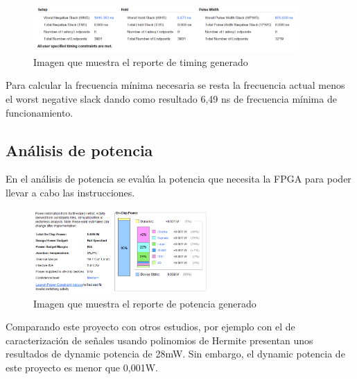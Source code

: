 	\begin{figure}[h!]
		\centering
		\includegraphics[width=0.9\textwidth]{./Images/img_res_experimentales/reportetiming.png}
		\caption{Imagen que muestra el reporte de timing generado}
		\label{fig:reporteTiming}
	\end{figure} 

	Para calcular la frecuencia mínima necesaria se resta la frecuencia actual menos el worst negative slack dando como resultado 6,49 ns de frecuencia mínima de funcionamiento. 

\subsection{Análisis de potencia}

	En el análisis de potencia se evalúa la potencia que necesita la FPGA para poder llevar a cabo las instrucciones.

	\begin{figure}[h!]
		\centering
		\includegraphics[width=0.6\textwidth]{./Images/img_res_experimentales/reportepower.png}
		\caption{Imagen que muestra el reporte de potencia generado}
		\label{fig:reportepotencia}
	\end{figure} 

	Comparando este proyecto con otros estudios, por ejemplo con el de caracterización de señales usando polinomios de Hermite presentan unos resultados de dynamic potencia de 28mW.
	Sin embargo, el dynamic potencia de este proyecto es menor que 0,001W.








	